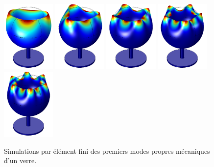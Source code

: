 \documentclass[12pt,a4paper]{article}
\begin{document}
\begin{figure}[b]
\center
\includegraphics[height=100pt]{figures/wine_glass_f0_small.png}
\hfill
\includegraphics[height=100pt]{figures/wine_glass_f1_small.png}
\hfill
\includegraphics[height=100pt]{figures/wine_glass_f2_small.png}
\hfill
\includegraphics[height=100pt]{figures/wine_glass_f3_small.png}
\hfill
\includegraphics[height=100pt]{figures/wine_glass_f4_small.png}
\caption{Simulations par élément fini des premiers modes propres mécaniques d'un verre.}
\label{fig:wine_glass}
\end{figure}
\end{document}
